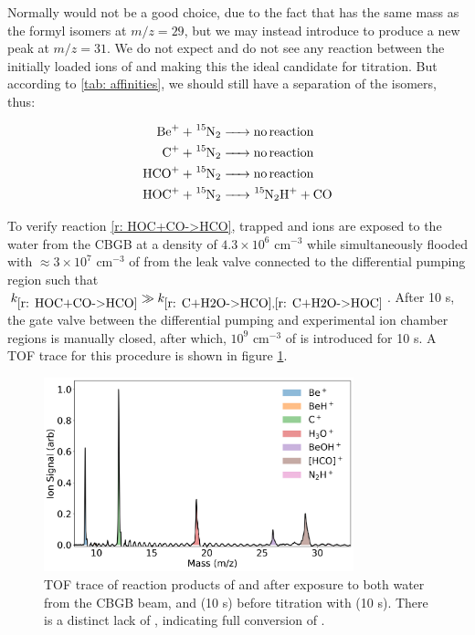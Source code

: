 Normally  would not be a good choice, due to the fact that  has the same mass as the formyl isomers at $m/z=29$, but we may instead introduce  to produce a new peak at $m/z=31$. We do not expect and do not see any reaction between the initially loaded ions of  and  making this the ideal candidate for titration. But according to \cref{tab: affinities}, we should still have a separation of the isomers, thus:

\begin{align}
	\ce{Be+ + ^15N2 & -> no reaction} \nonumber \\
	\ce{C+ + ^15N2 & -> no reaction} \nonumber \\
	\ce{HCO+ + ^15N2 & -> no reaction} \label{r: HCO+N2->NA} \\
	\ce{HOC+ + ^15N2 & -> ^15N2H+ + CO} \label{r: HOC+N2->N2H}
\end{align}

To verify reaction \ref{r: HOC+CO->HCO}, trapped  and  ions are exposed to the water from the CBGB at a density of $4.3 \times 10^6$ cm$^{-3}$ while simultaneously flooded with $\approx 3 \times 10^7$ cm$^{-3}$ of  from the leak valve connected to the differential pumping region such that $k_{\ref{r: HOC+CO->HCO}} \gg k_{\ref{r: C+H2O->HCO}, \ref{r: C+H2O->HOC}}$. After 10 s, the gate valve between the differential pumping and experimental ion chamber regions is manually closed, after which, $10^9$ cm$^{-3}$ of  is introduced for 10 s. A TOF trace for this procedure is shown in figure \ref{fig: CO N2 TOF}.

\begin{figure}[H]
	\centering
	\includegraphics[width=0.8\textwidth]{images/C_H2O_CO_15N2.png}
	\caption{TOF trace of reaction products of  and  after exposure to both water from the CBGB beam, and  (10 s) before titration with  (10 s). There is a distinct lack of , indicating full conversion of .}
	\label{fig: CO N2 TOF}
\end{figure}

